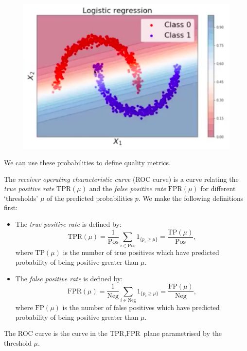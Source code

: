 \begin{figure}[H]
\centering
\includegraphics[scale=0.35]{classifierprobability.png}
\end{figure}

We can use these probabilities to define quality metrics.

\begin{framedef}
The \textit{receiver operating characteristic curve} (ROC curve) is a curve relating the \textit{true positive rate} $\text{TPR}(\mu)$ and the \textit{false positive rate} $\text{FPR}(\mu)$ for different `thresholds' $\mu$ of the predicted probabilities $p$. We make the following definitions first:
\begin{itemize}
\item The \textit{true positive rate} is defined by:
\begin{equation*}
\text{TPR}(\mu) = \frac{1}{\text{Pos}} \sum_{i \in \text{Pos}} 1_{\{p_i \geq \mu\}} = \frac{\text{TP}(\mu)}{\text{Pos}},
\end{equation*}
where $\text{TP}(\mu)$ is the number of true positives which have predicted probability of being positive greater than $\mu$.
\item The \textit{false positive rate} is defined by:
\begin{equation*}
\text{FPR}(\mu) = \frac{1}{\text{Neg}} \sum_{i \in \text{Neg}} 1_{\{p_i \geq \mu\}} = \frac{\text{FP}(\mu)}{\text{Neg}},
\end{equation*}
where $\text{FP}(\mu)$ is the number of false positives which have predicted probability of being positive greater than $\mu$.
\end{itemize}
The ROC curve is the curve in the $\text{TPR}, \text{FPR}$ plane parametrised by the threshold $\mu$.
\end{framedef}

